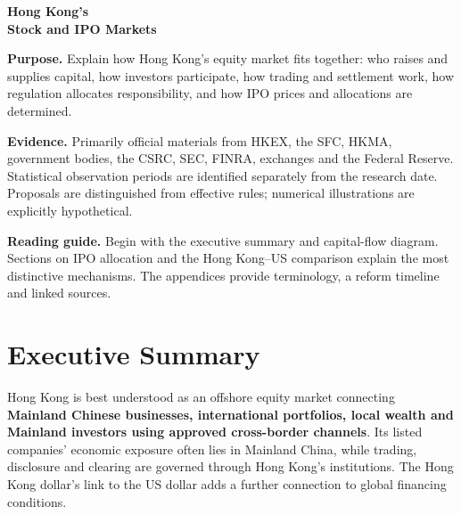 \documentclass[11pt,a4paper]{article}
\begin{document}
\begin{titlepage}
\centering\vspace*{22mm}
{\Huge\bfseries\color{ink} Hong Kong's\\[4mm] Stock and IPO Markets\par}
\vspace{10mm}{\LARGE Market Overview, Capital Sources,\\[2mm] Participants, Regulation and Mechanisms\par}
\vspace{10mm}{\Large A Comparative Analysis with the United States\par}
\vspace{15mm}{\large Comprehensive Research Report\par}
\vspace{4mm}{\large Research and rule-verification date: 4 October 2026\par}
\vfill
\begin{minipage}{0.9\textwidth}
\textbf{Purpose.} Explain how Hong Kong's equity market fits together: who raises and supplies capital, how investors participate, how trading and settlement work, how regulation allocates responsibility, and how IPO prices and allocations are determined.

\textbf{Evidence.} Primarily official materials from HKEX, the SFC, HKMA, government bodies, the CSRC, SEC, FINRA, exchanges and the Federal Reserve. Statistical observation periods are identified separately from the research date. Proposals are distinguished from effective rules; numerical illustrations are explicitly hypothetical.

\textbf{Reading guide.} Begin with the executive summary and capital-flow diagram. Sections on IPO allocation and the Hong Kong--US comparison explain the most distinctive mechanisms. The appendices provide terminology, a reform timeline and linked sources.
\end{minipage}\vspace{12mm}
\end{titlepage}
\tableofcontents\clearpage

\section{Executive Summary}
Hong Kong is best understood as an offshore equity market connecting \textbf{Mainland Chinese businesses, international portfolios, local wealth and Mainland investors using approved cross-border channels}. Its listed companies' economic exposure often lies in Mainland China, while trading, disclosure and clearing are governed through Hong Kong's institutions. The Hong Kong dollar's link to the US dollar adds a further connection to global financing conditions.
\end{document}
